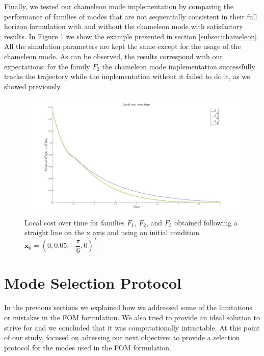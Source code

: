 \documentclass[12,twoside]{TFG-GM}
\theoremstyle{definition}
\theoremstyle{remark}
\begin{document}
Finally, we tested our chameleon mode implementation by comparing the performance of families of modes that are not sequentially consistent in their full horizon formulation with and without the chameleon mode with satisfactory results. In Figure \ref{fig:chameleon} we show the example presented in section \ref{subsec:chameleon}. All the simulation parameters are kept the same except for the usage of the chameleon mode. As can be observed, the results correspond with our expectations: for the family $F_2$ the chameleon mode implementation successfully tracks the trajectory while the implementation without it failed to do it, as we showed previously.

\begin{figure}[htb!]
\begin{center}
\includegraphics[width=16cm]{chameleon.jpg}
\end{center}
\caption{\label{fig:chameleon} \small Local cost over time for families $F_1$, $F_2$, and $F_3$ obtained following a straight line on the x axis and using an initial condition $\textbf{x}_0 = (0, 0.05, - \dfrac{\pi}{6}, 0)^T$.}
\end{figure}

\newpage

\section{Mode Selection Protocol}
\label{sec:modeselection}
In the previous sections we explained how we addressed some of the limitations or mistakes in the FOM formulation. We also tried to provide an ideal solution to strive for and we concluded that it was computationally intractable. At this point of our study, focused on adressing our next objective: to provide a selection protocol for the modes used in the FOM formulation.
\end{document}
